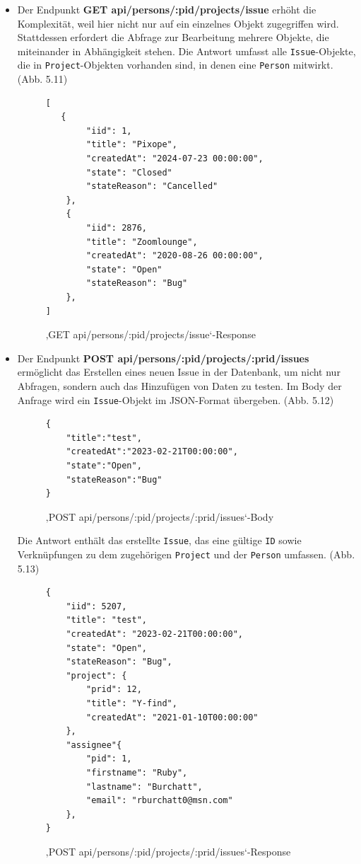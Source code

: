\begin{itemize}
\item Der Endpunkt \colorbox{gray!20}{\textbf{GET api/persons/:pid/projects/issue}} erhöht die Komplexität, weil hier nicht nur auf ein einzelnes Objekt zugegriffen wird. Stattdessen erfordert die Abfrage zur Bearbeitung mehrere Objekte, die miteinander in Abhängigkeit stehen. Die Antwort umfasst alle  \texttt{Issue}-Objekte, die in  \texttt{Project}-Objekten vorhanden sind, in denen eine  \texttt{Person} mitwirkt. (Abb. 5.11)
\begin{figure}[H]
\begin{center}
\begin{BVerbatim}
[
   {
        "iid": 1,
        "title": "Pixope",
        "createdAt": "2024-07-23 00:00:00",
        "state": "Closed"
        "stateReason": "Cancelled"
    },
    {
        "iid": 2876,
        "title": "Zoomlounge",
        "createdAt": "2020-08-26 00:00:00",
        "state": "Open"
        "stateReason": "Bug"
    },
]
\end{BVerbatim}
\end{center}
\caption{‚GET api/persons/:pid/projects/issue‘-Response}
\end{figure}

\item Der Endpunkt \colorbox{gray!20}{\textbf{POST api/persons/:pid/projects/:prid/issues}} ermöglicht das Erstellen eines neuen Issue in der Datenbank, um nicht nur Abfragen, sondern auch das Hinzufügen von Daten zu testen. Im Body der Anfrage wird ein  \texttt{Issue}-Objekt im JSON-Format übergeben. (Abb. 5.12)
\newline
\begin{figure}[H]
\begin{center}
\begin{BVerbatim}
{
    "title":"test",
    "createdAt":"2023-02-21T00:00:00",
    "state":"Open",
    "stateReason":"Bug"
}
\end{BVerbatim}
\end{center}
\caption{‚POST api/persons/:pid/projects/:prid/issues‘-Body}
\end{figure}
Die Antwort enthält das erstellte \texttt{Issue}, das eine gültige  \texttt{ID} sowie Verknüpfungen zu dem zugehörigen  \texttt{Project} und der  \texttt{Person} umfassen. (Abb. 5.13)
\begin{figure}[H]
\begin{center}
\begin{BVerbatim}
{
    "iid": 5207,
    "title": "test",
    "createdAt": "2023-02-21T00:00:00",
    "state": "Open",
    "stateReason": "Bug",
    "project": {
        "prid": 12,
        "title": "Y-find",
        "createdAt": "2021-01-10T00:00:00"
    },
    "assignee"{
        "pid": 1,
        "firstname": "Ruby",
        "lastname": "Burchatt",
        "email": "rburchatt0@msn.com"
    },
}
\end{BVerbatim}
\end{center}
\caption{‚POST api/persons/:pid/projects/:prid/issues‘-Response}
\end{figure}
\end{itemize}

